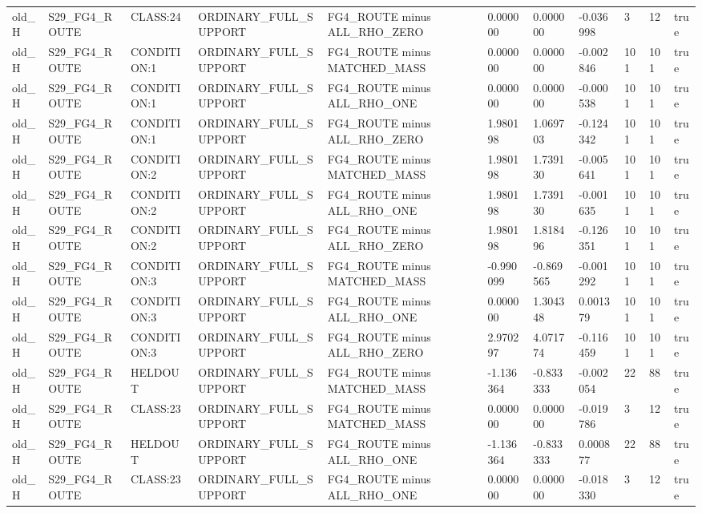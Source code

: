 \begin{tabular}{lllllllllll}
old\_H & S29\_FG4\_ROUTE & CLASS:24 & ORDINARY\_FULL\_SUPPORT & FG4\_ROUTE minus ALL\_RHO\_ZERO & 0.000000 & 0.000000 & -0.036998 & 3 & 12 & true \\
old\_H & S29\_FG4\_ROUTE & CONDITION:1 & ORDINARY\_FULL\_SUPPORT & FG4\_ROUTE minus MATCHED\_MASS & 0.000000 & 0.000000 & -0.002846 & 101 & 101 & true \\
old\_H & S29\_FG4\_ROUTE & CONDITION:1 & ORDINARY\_FULL\_SUPPORT & FG4\_ROUTE minus ALL\_RHO\_ONE & 0.000000 & 0.000000 & -0.000538 & 101 & 101 & true \\
old\_H & S29\_FG4\_ROUTE & CONDITION:1 & ORDINARY\_FULL\_SUPPORT & FG4\_ROUTE minus ALL\_RHO\_ZERO & 1.980198 & 1.069703 & -0.124342 & 101 & 101 & true \\
old\_H & S29\_FG4\_ROUTE & CONDITION:2 & ORDINARY\_FULL\_SUPPORT & FG4\_ROUTE minus MATCHED\_MASS & 1.980198 & 1.739130 & -0.005641 & 101 & 101 & true \\
old\_H & S29\_FG4\_ROUTE & CONDITION:2 & ORDINARY\_FULL\_SUPPORT & FG4\_ROUTE minus ALL\_RHO\_ONE & 1.980198 & 1.739130 & -0.001635 & 101 & 101 & true \\
old\_H & S29\_FG4\_ROUTE & CONDITION:2 & ORDINARY\_FULL\_SUPPORT & FG4\_ROUTE minus ALL\_RHO\_ZERO & 1.980198 & 1.818496 & -0.126351 & 101 & 101 & true \\
old\_H & S29\_FG4\_ROUTE & CONDITION:3 & ORDINARY\_FULL\_SUPPORT & FG4\_ROUTE minus MATCHED\_MASS & -0.990099 & -0.869565 & -0.001292 & 101 & 101 & true \\
old\_H & S29\_FG4\_ROUTE & CONDITION:3 & ORDINARY\_FULL\_SUPPORT & FG4\_ROUTE minus ALL\_RHO\_ONE & 0.000000 & 1.304348 & 0.001379 & 101 & 101 & true \\
old\_H & S29\_FG4\_ROUTE & CONDITION:3 & ORDINARY\_FULL\_SUPPORT & FG4\_ROUTE minus ALL\_RHO\_ZERO & 2.970297 & 4.071774 & -0.116459 & 101 & 101 & true \\
old\_H & S29\_FG4\_ROUTE & HELDOUT & ORDINARY\_FULL\_SUPPORT & FG4\_ROUTE minus MATCHED\_MASS & -1.136364 & -0.833333 & -0.002054 & 22 & 88 & true \\
old\_H & S29\_FG4\_ROUTE & CLASS:23 & ORDINARY\_FULL\_SUPPORT & FG4\_ROUTE minus MATCHED\_MASS & 0.000000 & 0.000000 & -0.019786 & 3 & 12 & true \\
old\_H & S29\_FG4\_ROUTE & HELDOUT & ORDINARY\_FULL\_SUPPORT & FG4\_ROUTE minus ALL\_RHO\_ONE & -1.136364 & -0.833333 & 0.000877 & 22 & 88 & true \\
old\_H & S29\_FG4\_ROUTE & CLASS:23 & ORDINARY\_FULL\_SUPPORT & FG4\_ROUTE minus ALL\_RHO\_ONE & 0.000000 & 0.000000 & -0.018330 & 3 & 12 & true \\

\end{tabular}
